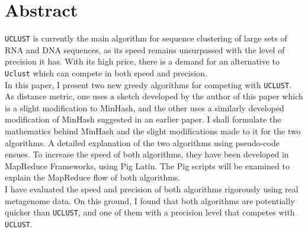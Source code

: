 \documentclass[../../main.tex]{subfiles}
\begin{document}
\section*{Abstract}

{\tt UCLUST} is currently the main algorithm for sequence clustering of large sets of RNA and DNA sequences, as its speed remains unsurpassed with the level of precision it has. With its high price, there is a demand for an alternative to {\tt Uclust} which can compete in both speed and precision.\\

In this paper, I present two new greedy algorithms for competing with {\tt UCLUST}. As distance metric, one uses a sketch developed by the author of this paper which is a slight modification to MinHash, and the other uses a similarly developed modification of MinHash suggested in an earlier paper. I shall formulate the mathematics behind MinHash and the slight modifications made to it for the two algorithms. A detailed explanation of the two algorithms using pseudo-code ensues. To increase the speed of both algorithms, they have been developed in MapReduce Frameworks, using Pig Latin. The Pig scripts will be examined to explain the MapReduce flow of both algorithms.\\

I have evaluated the speed and precision of both algorithms rigorously using real metagenome data. On this ground, I found that both algorithms are potentially quicker than {\tt UCLUST}, and one of them with a precision level that competes with {\tt UCLUST}.
\end{document}
